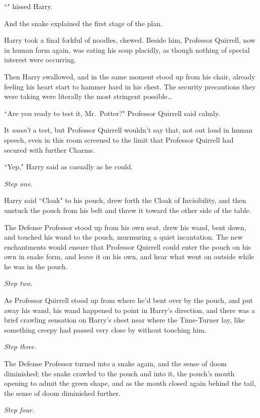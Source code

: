 ``" hissed Harry.

And the snake explained the first stage of the plan.

\later

Harry took a final forkful of noodles, chewed. Beside him, Professor Quirrell, now in human form again, was eating his soup placidly, as though nothing of special interest were occurring.

Then Harry swallowed, and in the same moment stood up from his chair, already feeling his heart start to hammer hard in his chest. The security precautions they were taking were literally the most stringent possible{\ldots}

``Are you ready to test it, Mr.~Potter?" Professor Quirrell said calmly.

It \emph{wasn't} a test, but Professor Quirrell wouldn't say that, not out loud in human speech, even in this room screened to the limit that Professor Quirrell had secured with further Charms.

``Yep," Harry said as casually as he could.

\emph{Step one.}

Harry said ``Cloak" to his pouch, drew forth the Cloak of Invisibility, and then unstuck the pouch from his belt and threw it toward the other side of the table.

The Defense Professor stood up from his own seat, drew his wand, bent down, and touched his wand to the pouch, murmuring a quiet incantation. The new enchantments would ensure that Professor Quirrell could enter the pouch on his own in snake form, and leave it on his own, and hear what went on outside while he was in the pouch.

\emph{Step two.}

As Professor Quirrell stood up from where he'd bent over by the pouch, and put away his wand, his wand happened to point in Harry's direction, and there was a brief crawling sensation on Harry's chest near where the Time-Turner lay, like something creepy had passed very close by without touching him.

\emph{Step three.}

The Defense Professor turned into a snake again, and the sense of doom diminished; the snake crawled to the pouch and into it, the pouch's mouth opening to admit the green shape, and as the mouth closed again behind the tail, the sense of doom diminished further.

\emph{Step four.}

